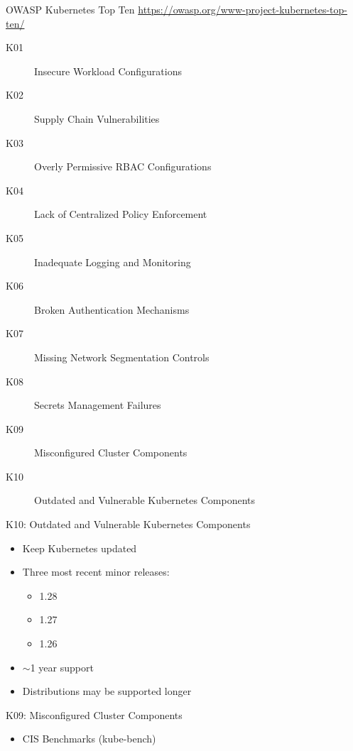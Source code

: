 \documentclass{dcpresentation}
\begin{document}

\begin{frame}{OWASP Kubernetes Top Ten}
  {\url{https://owasp.org/www-project-kubernetes-top-ten/}}
 \begin{description}
  \item[K01] Insecure Workload Configurations
  \item[K02] Supply Chain Vulnerabilities
  \item[K03] Overly Permissive RBAC Configurations
  \item[K04] Lack of Centralized Policy Enforcement
  \item[K05] Inadequate Logging and Monitoring
  \item[K06] Broken Authentication Mechanisms
  \item[K07] Missing Network Segmentation Controls
  \item[K08] Secrets Management Failures
  \item[K09] Misconfigured Cluster Components
  \item[K10] Outdated and Vulnerable Kubernetes Components
 \end{description}
\end{frame}

\begin{frame}{K10: Outdated and Vulnerable Kubernetes Components}
 \begin{itemize}
  \item Keep Kubernetes updated
  \item Three most recent minor releases:
  \begin{itemize}
   \item 1.28
   \item 1.27
   \item 1.26
  \end{itemize}
  \item $\sim$1 year support
  \item Distributions may be supported longer
 \end{itemize}
\end{frame}

\begin{frame}{K09: Misconfigured Cluster Components}
 \begin{itemize}
  \item CIS Benchmarks (kube-bench)
 \end{itemize}
\end{frame}
\end{document}
